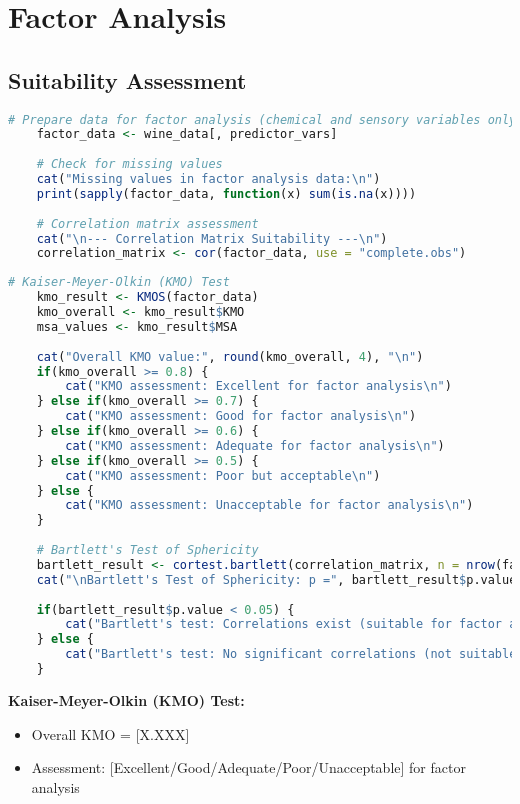 \section{Factor Analysis}

\subsection{Suitability Assessment}

\begin{lstlisting}[language=R, caption=Factor Analysis Preparation, breaklines=true]
	# Prepare data for factor analysis (chemical and sensory variables only)
	factor_data <- wine_data[, predictor_vars]
	
	# Check for missing values
	cat("Missing values in factor analysis data:\n")
	print(sapply(factor_data, function(x) sum(is.na(x))))
	
	# Correlation matrix assessment
	cat("\n--- Correlation Matrix Suitability ---\n")
	correlation_matrix <- cor(factor_data, use = "complete.obs")
\end{lstlisting}

\begin{lstlisting}[language=R, caption=KMO and Bartlett Tests, breaklines=true]
	# Kaiser-Meyer-Olkin (KMO) Test
	kmo_result <- KMOS(factor_data)
	kmo_overall <- kmo_result$KMO
	msa_values <- kmo_result$MSA
	
	cat("Overall KMO value:", round(kmo_overall, 4), "\n")
	if(kmo_overall >= 0.8) {
		cat("KMO assessment: Excellent for factor analysis\n")
	} else if(kmo_overall >= 0.7) {
		cat("KMO assessment: Good for factor analysis\n")
	} else if(kmo_overall >= 0.6) {
		cat("KMO assessment: Adequate for factor analysis\n")
	} else if(kmo_overall >= 0.5) {
		cat("KMO assessment: Poor but acceptable\n")
	} else {
		cat("KMO assessment: Unacceptable for factor analysis\n")
	}
	
	# Bartlett's Test of Sphericity
	bartlett_result <- cortest.bartlett(correlation_matrix, n = nrow(factor_data))
	cat("\nBartlett's Test of Sphericity: p =", bartlett_result$p.value, "\n")
	
	if(bartlett_result$p.value < 0.05) {
		cat("Bartlett's test: Correlations exist (suitable for factor analysis)\n")
	} else {
		cat("Bartlett's test: No significant correlations (not suitable)\n")
	}
\end{lstlisting}

\textbf{Kaiser-Meyer-Olkin (KMO) Test:}
\begin{itemize}
	\item Overall KMO = [X.XXX]
	\item Assessment: [Excellent/Good/Adequate/Poor/Unacceptable] for factor analysis
\end{itemize}

